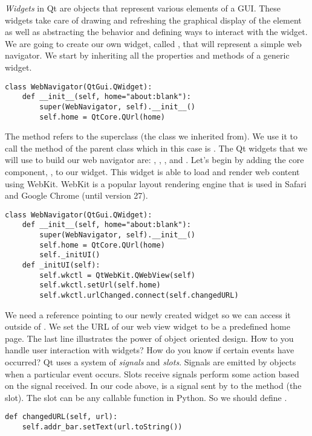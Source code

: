\emph{Widgets} in Qt are objects that represent various elements of a GUI.
These widgets take care of drawing and refreshing the graphical display of the element as well as abstracting the behavior and defining ways to interact with the widget.
We are going to create our own widget, called , that will represent a simple web navigator.
We start by inheriting all the properties and methods of a generic widget.
\begin{lstlisting}
class WebNavigator(QtGui.QWidget):
    def __init__(self, home="about:blank"):
        super(WebNavigator, self).__init__()
        self.home = QtCore.QUrl(home)
\end{lstlisting}
The  method refers to the superclass (the class we inherited from).
We use it to call the  method of the parent class which in this case is .
The Qt widgets that we will use to build our web navigator are: , , , and .
Let's begin by adding the core component, , to our widget.
This widget is able to load and render web content using WebKit.
WebKit is a popular layout rendering engine that is used in Safari and Google Chrome (until version 27).
\begin{lstlisting}
class WebNavigator(QtGui.QWidget):
    def __init__(self, home="about:blank"):
        super(WebNavigator, self).__init__()
        self.home = QtCore.QUrl(home)
        self._initUI()
    def _initUI(self):
        self.wkctl = QtWebKit.QWebView(self)
        self.wkctl.setUrl(self.home)
        self.wkctl.urlChanged.connect(self.changedURL)
\end{lstlisting}
We need a reference pointing to our newly created  widget so we can access it outside of .
We set the URL of our web view widget to be a predefined home page.  
The last line illustrates the power of object oriented design.
How to you handle user interaction with widgets?
How do you know if certain events have occurred?
Qt uses a system of \emph{signals} and \emph{slots}.
Signals are emitted by objects when a particular event occurs.
Slots receive signals perform some action based on the signal received.
In our code above,  is a signal sent by  to the method  (the slot).
The slot can be any callable function in Python.
So we should define .
\begin{lstlisting}
def changedURL(self, url):
    self.addr_bar.setText(url.toString())
\end{lstlisting}

